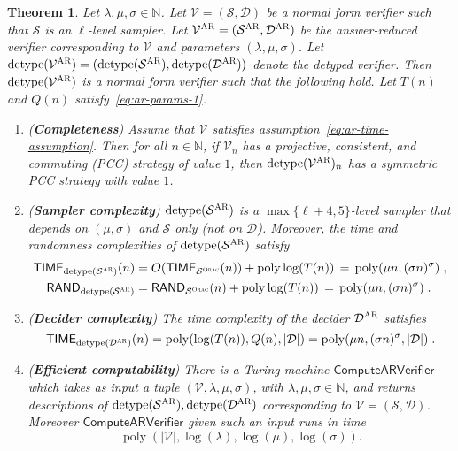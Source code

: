 \documentclass[11pt]{article}
\newtheorem{theorem}{Theorem}[section]
\theoremstyle{definition}
\newcommand{\N}{\ensuremath{\mathbb{N}}}
\DeclareMathOperator{\poly}{poly}
\newcommand{\abs}[1]{\left\vert {#1} \right\vert}
\newcommand{\sampler}{\mathcal{S}}
\newcommand{\decider}{\mathcal{D}}
\newcommand{\verifier}{\mathcal{V}}
\newcommand{\detype}{\mathrm{detype}}
\newcommand{\gamestyle}[1]{\ensuremath{\textsc{#1}}\xspace}
\newcommand{\ora}{\gamestyle{Orac}}
\newcommand{\ar}{\gamestyle{AR}}
\newcommand{\timecomplexity}{\mathsf{TIME}}
\newcommand{\randcomplexity}{\mathsf{RAND}}
\newcommand{\RAND}{\mathsf{RAND}}
\newcommand{\tmstyle}[1]{\ensuremath{\mathsf{#1}}}
\newcommand{\ComputeAnsVerifier}{\tmstyle{ComputeARVerifier}}
\begin{document}
\begin{theorem}\label{thm:answer-red-completeness}
  Let $\lambda,\mu, \sigma \in \N$.
  Let $\verifier = (\sampler, \decider)$ be a normal form verifier such that
  $\sampler$ is an $\ell$-level sampler.
  Let $\verifier^\ar = (\sampler^\ar, \decider ^\ar)$ be the answer-reduced
  verifier corresponding to $\verifier$ and parameters $(\lambda,\mu, \sigma)$.
  Let $\detype(\verifier^\ar) = (\detype(\sampler^\ar), \detype(\decider^\ar))$
  denote the detyped verifier.
  Then $\detype(\verifier^\ar)$ is a normal form verifier such that the
  following hold.
  Let $T(n)$ and $Q(n)$ satisfy~\eqref{eq:ar-params-1}.

  \begin{enumerate}
  \item (\textbf{Completeness}) Assume that $\verifier$ satisfies
    assumption~\eqref{eq:ar-time-assumption}.
    Then for all $n \in \N$, if $\verifier_n$ has a projective, consistent, and
    commuting (PCC) strategy of value $1$, then $\detype(\verifier^\ar)_n$ has a
    symmetric PCC strategy with value $1$.
    \label{enu:ar-completeness}
  \item \label{enu:ar-sampler-complexity} (\textbf{Sampler complexity})
    $\detype(\sampler^\ar)$ is a $\max\{\ell+4,5\}$-level sampler that depends
    on $(\mu,\sigma)$ and $\sampler$ only (not on $\decider$).
    Moreover, the time and randomness complexities of $\detype(\sampler^\ar)$
    satisfy
    \begin{align*}
      \timecomplexity_{\detype(\sampler^\ar)}(n)
      & = O(\timecomplexity_{\sampler^\ora}(n)) + \poly\log(T(n))\,=\,
        \poly(\mu n,(\sigma n)^\sigma)\;,\\
      \randcomplexity_{\detype(\sampler^\ar)}
      & = \RAND_{\sampler^{\ora}}(n) + \poly\log(T(n))\,=\,
        \poly(\mu n,(\sigma n)^\sigma)\;.
    \end{align*}
  \item \label{enu:ar-decider-complexity} (\textbf{Decider complexity}) The time
    complexity of the decider $\decider^\ar$ satisfies
    \begin{equation*}
      \timecomplexity_{\detype(\decider^\ar)}(n) =
      \poly(\log(T(n)),Q(n),|\decider|) =
      \poly(\mu n,(\sigma n)^\sigma,|\decider|) \;.
    \end{equation*}
  \item (\textbf{Efficient computability}) \label{enu:ar-computability} There is
    a Turing machine $\ComputeAnsVerifier$ which takes as input a tuple
    $(\verifier, \lambda, \mu, \sigma)$, with $\lambda, \mu, \sigma \in \N$, and
    returns descriptions of $\detype(\sampler^\ar), \detype(\decider^\ar)$
    corresponding to $\verifier=(\sampler, \decider)$.
    Moreover $\ComputeAnsVerifier$ given such an input runs in time
    \begin{equation*}
      \poly(\abs{\verifier}, \log(\lambda), \log(\mu), \log(\sigma)).
    \end{equation*}
  \end{enumerate}
\end{theorem}
\end{document}
